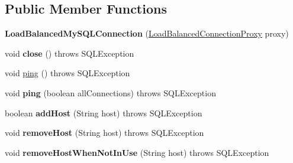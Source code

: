 \subsection*{Public Member Functions}
\begin{DoxyCompactItemize}
\item 
\mbox{\label{classcom_1_1mysql_1_1jdbc_1_1_load_balanced_my_s_q_l_connection_aedb04b13ef6a687103623ab9820b1fde}} 
{\bfseries Load\+Balanced\+My\+S\+Q\+L\+Connection} (\mbox{\hyperlink{classcom_1_1mysql_1_1jdbc_1_1_load_balanced_connection_proxy}{Load\+Balanced\+Connection\+Proxy}} proxy)
\item 
\mbox{\label{classcom_1_1mysql_1_1jdbc_1_1_load_balanced_my_s_q_l_connection_ad1ecd19070f893d68d683f652162492a}} 
void {\bfseries close} ()  throws S\+Q\+L\+Exception 
\item 
void \mbox{\hyperlink{classcom_1_1mysql_1_1jdbc_1_1_load_balanced_my_s_q_l_connection_aa99b15e6981c678122ccce3aaf68e32c}{ping}} ()  throws S\+Q\+L\+Exception 
\item 
\mbox{\label{classcom_1_1mysql_1_1jdbc_1_1_load_balanced_my_s_q_l_connection_ad2e28ab2ef03137380da0b16badf74ca}} 
void {\bfseries ping} (boolean all\+Connections)  throws S\+Q\+L\+Exception 
\item 
\mbox{\label{classcom_1_1mysql_1_1jdbc_1_1_load_balanced_my_s_q_l_connection_a9efe106869313d4d5525f439d8cc34fb}} 
boolean {\bfseries add\+Host} (String host)  throws S\+Q\+L\+Exception 
\item 
\mbox{\label{classcom_1_1mysql_1_1jdbc_1_1_load_balanced_my_s_q_l_connection_ab1e613dcc9e9cbf766c9181f16e5186d}} 
void {\bfseries remove\+Host} (String host)  throws S\+Q\+L\+Exception 
\item 
\mbox{\label{classcom_1_1mysql_1_1jdbc_1_1_load_balanced_my_s_q_l_connection_aeef622076c347fea08bcbb1f35934937}} 
void {\bfseries remove\+Host\+When\+Not\+In\+Use} (String host)  throws S\+Q\+L\+Exception 
\end{DoxyCompactItemize}
